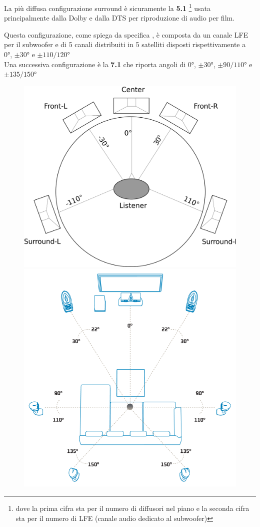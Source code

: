 \documentclass[12pt,a4paper]{report}
\begin{document}
La più diffusa configurazione surround è sicuramente la \textbf{5.1} \footnote{dove la prima cifra sta per il numero di diffusori nel piano e la seconda cifra sta per il numero di LFE (canale audio dedicato al subwoofer)} usata principalmente dalla Dolby e dalla DTS per riproduzione di audio per film.


Questa configurazione, come spiega da specifica \cite{5.1}, è composta da un canale LFE per il subwoofer e di 5 canali distribuiti in 5 satelliti disposti rispettivamente a 0°, $\pm30°$ e $\pm110/120°$\\

Una successiva configurazione è la \textbf{7.1} che riporta angoli di 0°, $\pm30°$, $\pm90/110°$ e $\pm135/150°$\\

\begin{figure}[htbp]
	\centering
	\includegraphics[scale=0.18]{figures/5-1.png}\includegraphics[scale=0.34]{figures/7-1.png}

\end{figure}
\end{document}
